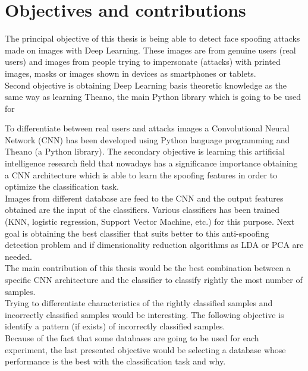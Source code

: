 \section{Objectives and contributions}
The principal objective of this thesis is being able to detect face spoofing attacks made on images with Deep Learning. These images are from genuine users (real users) and images from people trying to impersonate (attacks) with printed images, masks or images shown in devices as smartphones or tablets.\\

Second objective is obtaining Deep Learning basis theoretic knowledge as the same way as learning Theano, the main Python library which is going to be used for

To differentiate between real users and attacks images a Convolutional Neural Network (CNN) has been developed using Python language programming and Theano (a Python library). The secondary objective is learning this artificial intelligence research field that nowadays has a significance importance obtaining a CNN architecture which is able to learn the spoofing features in order to optimize the classification task.\\

Images from different database are feed to the CNN and the output features obtained are the input of the classifiers. Various classifiers has been trained (KNN, logistic regression, Support Vector Machine, etc.) for this purpose. Next goal is obtaining the best classifier that suits better to this anti-spoofing detection problem and if dimensionality reduction algorithms as LDA or PCA are needed.\\

The main contribution of this thesis would be the best combination between a specific CNN architecture and the classifier to classify rightly the most number of samples.\\

Trying to differentiate characteristics of the rightly classified samples and incorrectly classified samples would be interesting. The following objective is identify a pattern (if exists) of incorrectly classified samples.\\

Because of the fact that some databases are going to be used for each experiment, the last presented objective would be  selecting a database whose performance is the best with the classification task and why.\\

